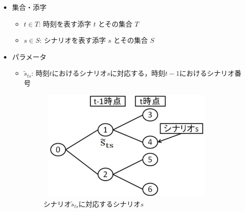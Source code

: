\documentclass[a4paper,12pt,showkeys]{jreport}
\begin{document}
\begin{itemize}
\item 集合・添字

\begin{itemize}
\item $t \in T$: 時刻を表す添字 $t$ とその集合 $T$
\item $s \in S$: シナリオを表す添字 $s$ とその集合 $S$
\end{itemize}

\item パラメータ
\begin{itemize}
\item $\tilde{s}_{ts}$: 時刻$t$におけるシナリオ$s$に対応する，時刻$t-1$におけるシナリオ番号

\begin{figure}[h]
\centering
\includegraphics[width=9cm,height=5.5cm, clip]{henka.eps}
\caption{シナリオ$\tilde{s}_{ts}$に対応するシナリオ$s$}
\label{fig:henka}
\end{figure}


\end{itemize}
\end{itemize}
\end{document}
